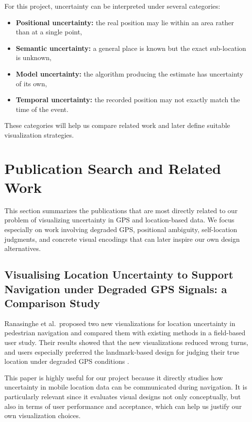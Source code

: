 \documentclass[conference]{IEEEtran}
\begin{document}
For this project, uncertainty can be interpreted under several categories:

\begin{itemize}[leftmargin=1.5em]
    \item \textbf{Positional uncertainty:} the real position may lie within an area rather than at a single point,
    \item \textbf{Semantic uncertainty:} a general place is known but the exact sub-location is unknown,
    \item \textbf{Model uncertainty:} the algorithm producing the estimate has uncertainty of its own,
    \item \textbf{Temporal uncertainty:} the recorded position may not exactly match the time of the event.
\end{itemize}

These categories will help us compare related work and later define suitable visualization strategies.

\section{Publication Search and Related Work}

This section summarizes the publications that are most directly related to our problem of visualizing uncertainty in GPS and location-based data. We focus especially on work involving degraded GPS, positional ambiguity, self-location judgments, and concrete visual encodings that can later inspire our own design alternatives.

\subsection{Visualising Location Uncertainty to Support Navigation under Degraded GPS Signals: a Comparison Study}

Ranasinghe et al.\ proposed two new visualizations for location uncertainty in pedestrian navigation and compared them with existing methods in a field-based user study. Their results showed that the new visualizations reduced wrong turns, and users especially preferred the landmark-based design for judging their true location under degraded GPS conditions \cite{ranasinghe2019visualising}.

This paper is highly useful for our project because it directly studies how uncertainty in mobile location data can be communicated during navigation. It is particularly relevant since it evaluates visual designs not only conceptually, but also in terms of user performance and acceptance, which can help us justify our own visualization choices.
\end{document}
